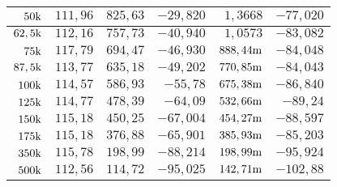 \begin{table}[H]
\begin{tabular}{rr||r|r||r|r|}
\multicolumn{1}{|r|}{$50\text{k}     $}                & $ 111,96 $  & $ 825,63  $ & $ -29,820 $ & $ 1,3668      $ & $ -77,020  $ \\ \hline
\multicolumn{1}{|r|}{$62,5\text{k}   $}                & $ 112,16 $  & $ 757,73  $ & $ -40,940 $ & $ 1,0573      $ & $ -83,082  $ \\ \hline
\multicolumn{1}{|r|}{$75\text{k}     $}                & $ 117,79 $  & $ 694,47  $ & $ -46,930 $ & $ 888,44\text{m}   $   & $ -84,048  $ \\ \hline
\multicolumn{1}{|r|}{$87,5\text{k}   $}                & $ 113,77 $  & $ 635,18  $ & $ -49,202 $ & $ 770,85\text{m}   $   & $ -84,043  $ \\ \hline
\multicolumn{1}{|r|}{$100\text{k}    $}                & $ 114,57 $  & $ 586,93  $ & $ -55,78  $ & $ 675,38\text{m}   $   & $ -86,840  $ \\ \hline
\multicolumn{1}{|r|}{$125\text{k}    $}                & $ 114,77 $  & $ 478,39  $ & $ -64,09  $ & $ 532,66\text{m}   $   & $ -89,24   $ \\ \hline
\multicolumn{1}{|r|}{$150\text{k}    $}                & $ 115,18 $  & $ 450,25  $ & $ -67,004 $ & $ 454,27\text{m}   $   & $ -88,597  $ \\ \hline
\multicolumn{1}{|r|}{$175\text{k}    $}                & $ 115,18 $  & $ 376,88  $ & $ -65,901 $ & $ 385,93\text{m}   $   & $ -85,203  $ \\ \hline
\multicolumn{1}{|r|}{$350\text{k}    $}                & $ 115,78 $  & $ 198,99  $ & $ -88,214 $ & $ 198,99\text{m}   $   & $ -95,924  $ \\ \hline
\multicolumn{1}{|r|}{$500\text{k}    $}                & $ 112,56 $  & $ 114,72  $ & $ -95,025 $ & $ 142,71\text{m}   $   & $ -102,88  $ \\ \hline
\end{tabular}
\end{table}